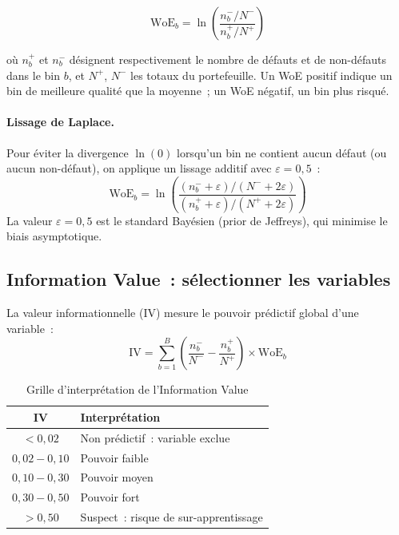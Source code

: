 \documentclass[12pt, a4paper, twoside, openright]{report}
\theoremstyle{definition}
\begin{document}
\begin{equation}
\text{WoE}_b = \ln\!\left(\frac{n^{-}_b / N^{-}}{n^{+}_b / N^{+}}\right)
\label{eq:woe}
\end{equation}

\noindent où $n^{+}_b$ et $n^{-}_b$ désignent respectivement le nombre de défauts et de non-défauts dans le bin $b$, et $N^{+}$, $N^{-}$ les totaux du portefeuille. Un WoE positif indique un bin de meilleure qualité que la moyenne~; un WoE négatif, un bin plus risqué.

\paragraph{Lissage de Laplace.} Pour éviter la divergence $\ln(0)$ lorsqu'un bin ne contient aucun défaut (ou aucun non-défaut), on applique un lissage additif avec $\varepsilon = 0{,}5$~:
\begin{equation}
\text{WoE}_b = \ln\!\left(\frac{(n^{-}_b + \varepsilon) / (N^{-} + 2\varepsilon)}{(n^{+}_b + \varepsilon) / (N^{+} + 2\varepsilon)}\right)
\label{eq:woe-laplace}
\end{equation}
La valeur $\varepsilon = 0{,}5$ est le standard Bayésien (prior de Jeffreys), qui minimise le biais asymptotique.

\subsection{Information Value~: sélectionner les variables}

La valeur informationnelle (IV) mesure le pouvoir prédictif global d'une variable~:
\begin{equation}
\text{IV} = \sum_{b=1}^{B} \left(\frac{n^{-}_b}{N^{-}} - \frac{n^{+}_b}{N^{+}}\right) \times \text{WoE}_b
\label{eq:iv}
\end{equation}

\begin{table}[htbp]
\centering
\caption{Grille d'interprétation de l'Information Value}
\label{tab:iv-grille}
\begin{tabular}{cl}
\toprule
IV & Interprétation \\
\midrule
$< 0{,}02$ & Non prédictif~: variable exclue \\
$0{,}02 - 0{,}10$ & Pouvoir faible \\
$0{,}10 - 0{,}30$ & Pouvoir moyen \\
$0{,}30 - 0{,}50$ & Pouvoir fort \\
$> 0{,}50$ & Suspect~: risque de sur-apprentissage \\
\bottomrule
\end{tabular}
\end{table}
\end{document}
